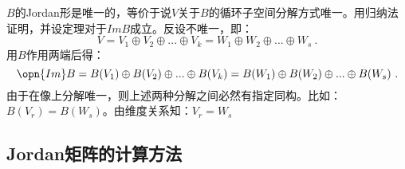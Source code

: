 $B$的Jordan形是唯一的，等价于说$V$关于$B$的循环子空间分解方式唯一。用归纳法证明，并设定理对于$Im B$成立。反设不唯一，即：
\begin{equation}
V=V_1\oplus V_2\oplus...\oplus V_k=W_1\oplus W_2\oplus...\oplus W_s~.
\end{equation}
用$B$作用两端后得：
\begin{equation}
\opn{Im}B=B(V_1)\oplus B(V_2)\oplus...\oplus B(V_k)=B(W_1)\oplus B(W_2)\oplus...\oplus B(W_s)~.
\end{equation}
由于在像上分解唯一，则上述两种分解之间必然有指定同构。比如：$B(V_r)=B(W_s)$。由维度关系知：$V_r=W_s$
\subsection{Jordan矩阵的计算方法}
